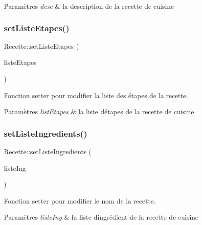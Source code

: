 \begin{DoxyParams}{Paramètres}
{\em desc} & la description de la recette de cuisine \\
\hline
\end{DoxyParams}
\mbox{\label{classRecette_a3a5b4231baeeae0a30588d1ca29c7e4e}} 
\subsubsection{\texorpdfstring{set\+Liste\+Etapes()}{setListeEtapes()}}
{\footnotesize\ttfamily Recette\+::set\+Liste\+Etapes (\begin{DoxyParamCaption}\item[{const Q\+String\+List \&}]{liste\+Etapes }\end{DoxyParamCaption})}



Fonction setter pour modifier la liste des étapes de la recette. 


\begin{DoxyParams}{Paramètres}
{\em list\+Etapes} & la liste d\textquotesingle{}étapes de la recette de cuisine \\
\hline
\end{DoxyParams}
\mbox{\label{classRecette_a08b6eff8e2b20a39edf7fc04c2a827f9}} 
\subsubsection{\texorpdfstring{set\+Liste\+Ingredients()}{setListeIngredients()}}
{\footnotesize\ttfamily Recette\+::set\+Liste\+Ingredients (\begin{DoxyParamCaption}\item[{const Q\+String\+List \&}]{liste\+Ing }\end{DoxyParamCaption})}



Fonction setter pour modifier le nom de la recette. 


\begin{DoxyParams}{Paramètres}
{\em liste\+Ing} & la liste d\textquotesingle{}ingrédient de la recette de cuisine \\
\hline
\end{DoxyParams}
\mbox{\label{classRecette_a943923535c745e6bf84cd55b223287d2}} 
